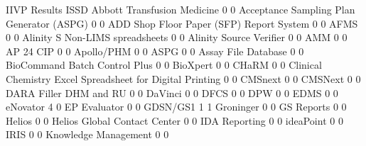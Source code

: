 \documentclass{article}
\begin{document}
\begin{Schunk}
\begin{Soutput}
                                                            IIVP Results ISSD
  Abbott Transfusion Medicine                                          0    0
  Acceptance Sampling Plan Generator (ASPG)                            0    0
  ADD Shop Floor Paper (SFP) Report System                             0    0
  AFMS                                                                 0    0
  Alinity S Non-LIMS spreadsheets                                      0    0
  Alinity Source Verifier                                              0    0
  AMM                                                                  0    0
  AP 24 CIP                                                            0    0
  Apollo/PHM                                                           0    0
  ASPG                                                                 0    0
  Assay File Database                                                  0    0
  BioCommand Batch Control Plus                                        0    0
  BioXpert                                                             0    0
  CHaRM                                                                0    0
  Clinical Chemistry Excel Spreadsheet for Digital Printing            0    0
  CMSnext                                                              0    0
  CMSNext                                                              0    0
  DARA Filler DHM and RU                                               0    0
  DaVinci                                                              0    0
  DFCS                                                                 0    0
  DPW                                                                  0    0
  EDMS                                                                 0    0
  eNovator                                                             4    0
  EP Evaluator                                                         0    0
  GDSN/GS1                                                             1    1
  Groninger                                                            0    0
  GS Reports                                                           0    0
  Helios                                                               0    0
  Helios Global Contact Center                                         0    0
  IDA Reporting                                                        0    0
  ideaPoint                                                            0    0
  IRIS                                                                 0    0
  Knowledge Management                                                 0    0

\end{Soutput}
\end{Schunk}
\end{document}
